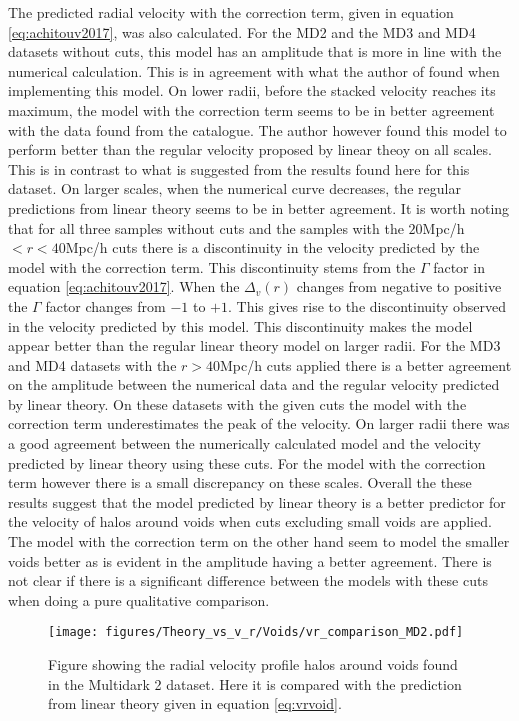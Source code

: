 The predicted radial velocity with the correction term, given in equation \ref{eq:achitouv2017}, was also calculated. For the MD2 and the MD3 and MD4 datasets without cuts, this model has an amplitude that is more in line with the numerical calculation. This is in agreement with what the author of \cite{Achitouv_streaming} found when implementing this model. On lower radii, before the stacked velocity reaches its maximum, the model with the correction term seems to be in better agreement with the data found from the catalogue. The author however found this model to perform better than the regular velocity proposed by linear theoy on all scales. This is in contrast to what is suggested from the results found here for this dataset. On larger scales, when the numerical curve decreases, the regular predictions from linear theory seems to be in better agreement. It is worth noting that for all three samples without cuts and the samples with the $20$Mpc/h$<r<40$Mpc/h cuts there is a discontinuity in the velocity predicted by the model with the correction term. This discontinuity stems from the $\Gamma$ factor in equation \ref{eq:achitouv2017}. When the $\Delta_v(r)$ changes from negative to positive the $\Gamma$ factor changes from $-1$ to $+1$. This gives rise to the discontinuity observed in the velocity predicted by this model. This discontinuity makes the model appear better than the regular linear theory model on larger radii. For the MD3 and MD4 datasets with the $r>40$Mpc/h cuts applied there is a better agreement on the amplitude between the numerical data and the regular velocity predicted by linear theory. On these datasets with the given cuts the model with the correction term underestimates the peak of the velocity. On larger radii there was a good agreement between the numerically calculated model and the velocity predicted by linear theory using these cuts. For the model with the correction term however there is a small discrepancy on these scales. Overall the these results suggest that the model predicted by linear theory is a better predictor for the velocity of halos around voids when cuts excluding small voids are applied. The model with the correction term on the other hand seem to model the smaller voids better as is evident in the amplitude having a better agreement. There is not clear if there is a significant difference between the models with these cuts when doing a pure qualitative comparison.
\begin{figure}[H]
    \texttt{[image: figures/Theory\_vs\_v\_r/Voids/vr\_comparison\_MD2.pdf]}
    \caption{Figure showing the radial velocity profile halos around voids found in the Multidark 2 dataset. Here it is compared with the prediction from linear theory given in equation \ref{eq:vrvoid}.}
    \label{fig:vrMD2}
\end{figure}

